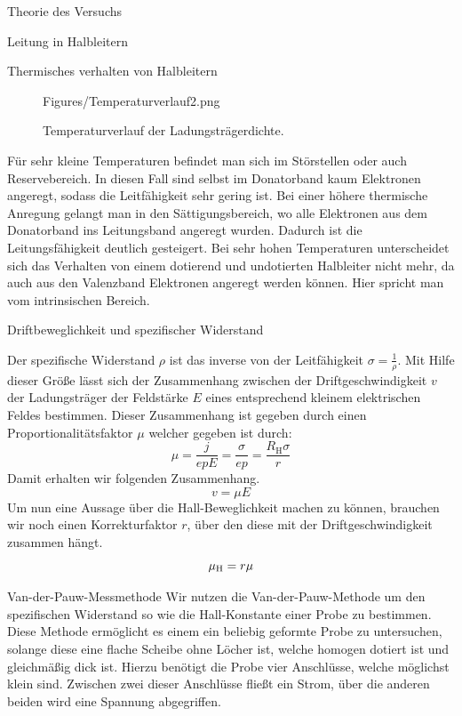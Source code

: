 \documentclass[pdftex, a4paper,11pt, twoside, ngerman]{report}
\begin{document}
\begin{chapter}{Theorie des Versuchs}
\begin{section}{Leitung in Halbleitern}
\begin{subsection}{Thermisches verhalten von Halbleitern}
\begin{figure}[ht!]
\begin{minipage}{.48\textwidth}
                    {Figures/Temperaturverlauf2.png}
                \caption{Temperaturverlauf der Ladungsträgerdichte.
                    \cite{bib:Temperaturverlauf2}}
                \label{fig:TempLeifaehigkeit}
              \end{minipage}
            \end{figure}

            Für sehr kleine Temperaturen befindet man sich im Störstellen oder auch Reservebereich. In diesen Fall sind selbst im Donatorband kaum Elektronen angeregt, sodass die Leitfähigkeit sehr gering ist.
            Bei einer höhere thermische Anregung gelangt man in den Sättigungsbereich, wo alle Elektronen aus dem Donatorband ins Leitungsband angeregt wurden.
            Dadurch ist die Leitungsfähigkeit deutlich gesteigert.
            Bei sehr hohen Temperaturen unterscheidet sich das Verhalten von einem dotierend und undotierten Halbleiter nicht mehr, da auch aus den Valenzband Elektronen angeregt werden können.
            Hier spricht man vom intrinsischen Bereich.

        \end{subsection}

        \begin{subsection}{Driftbeweglichkeit und spezifischer Widerstand}

            Der spezifische Widerstand $\rho$ ist das inverse von der Leitfähigkeit $\sigma = \frac 1\rho$.
            Mit Hilfe dieser Größe lässt sich der Zusammenhang zwischen der Driftgeschwindigkeit $v$ der Ladungsträger der Feldstärke $E$ eines entsprechend kleinem elektrischen Feldes bestimmen.
            Dieser Zusammenhang ist gegeben durch einen Proportionalitätsfaktor $\mu$ welcher gegeben ist durch:
            \[
                \mu = \frac j{epE} = \frac \sigma{ep} = \frac{R_\text{H} \sigma}r
            \]
            Damit erhalten wir folgenden Zusammenhang.
            \[
                v = \mu E
            \]
            Um nun eine Aussage über die Hall-Beweglichkeit machen zu können, brauchen wir noch einen Korrekturfaktor $r$, über den diese mit der Driftgeschwindigkeit zusammen hängt.
            \[
                \mu_\text H =r\mu
            \]

        \end{subsection}

        \begin{subsection}{Van-der-Pauw-Messmethode}
            Wir nutzen die Van-der-Pauw-Methode um den spezifischen Widerstand so wie die Hall-Konstante einer Probe zu bestimmen.
            Diese Methode ermöglicht es einem ein beliebig geformte Probe zu untersuchen, solange diese eine flache Scheibe ohne Löcher ist, welche homogen dotiert ist und gleichmäßig dick ist.
            Hierzu benötigt die Probe vier Anschlüsse, welche möglichst klein sind. 
            Zwischen zwei dieser Anschlüsse fließt ein Strom, über die anderen beiden wird eine Spannung abgegriffen.
            

\end{subsection}
\end{section}
\end{chapter}
\end{document}
